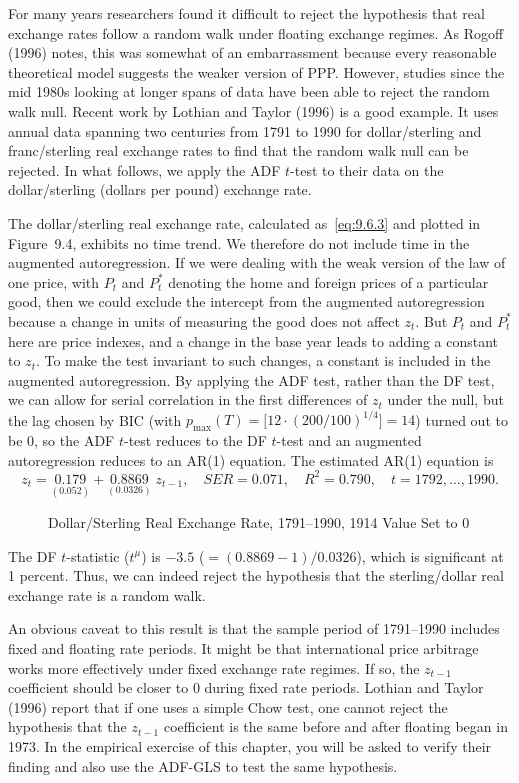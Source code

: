 For many years researchers found it difficult to reject the hypothesis that real
exchange rates follow a random walk under floating exchange regimes. As Rogoff
(1996) notes, this was somewhat of an embarrassment because every reasonable
theoretical model suggests the weaker version of PPP. However, studies since the
mid 1980s looking at longer spans of data have been able to reject the random walk
null. Recent work by Lothian and Taylor (1996) is a good example. It uses annual
data spanning two centuries from 1791 to 1990 for dollar/sterling and franc/sterling
real exchange rates to find that the random walk null can be rejected. In what follows, we apply the ADF $t$-test to their data on the dollar/sterling (dollars per pound)
exchange rate.

The dollar/sterling real exchange rate, calculated as~\eqref{eq:9.6.3} and plotted in Figure~9.4, exhibits no time trend. We therefore do not include time in the augmented
autoregression. If we were dealing with the weak version of the law of one price,
with $P_t$ and $P_t^*$ denoting the home and foreign prices of a particular good, then we
could exclude the intercept from the augmented autoregression because a change
in units of measuring the good does not affect $z_t$. But $P_t$ and $P_t^*$ here are price
indexes, and a change in the base year leads to adding a constant to $z_t$. To make
the test invariant to such changes, a constant is included in the augmented autoregression. By applying the ADF test, rather than the DF test, we can allow for serial
correlation in the first differences of $z_t$ under the null, but the lag chosen by
BIC (with $p_{\max}(T) = \big[12 \cdot (200/100)^{1/4}\big] = 14$) turned out to be 0, so the ADF $t$-test reduces to the DF $t$-test and an augmented autoregression reduces to an AR(1)
equation. The estimated AR(1) equation is
\[
z_t = \underset{(0.052)}{0.179} + \underset{(0.0326)}{0.8869}\; z_{t-1},
\quad SER = 0.071, \quad R^2 = 0.790, \quad t = 1792, \ldots, 1990.
\]

\begin{figure}[htbp]
\centering
{}
\caption{Dollar/Sterling Real Exchange Rate, 1791--1990, 1914 Value Set to 0}
\label{fig:9.4}
\end{figure}

The DF $t$-statistic ($t^\mu$) is $-3.5$ ($= (0.8869 - 1)/0.0326$), which is significant at
1 percent. Thus, we can indeed reject the hypothesis that the sterling/dollar real
exchange rate is a random walk.

An obvious caveat to this result is that the sample period of 1791--1990 includes
fixed and floating rate periods. It might be that international price arbitrage works
more effectively under fixed exchange rate regimes. If so, the $z_{t-1}$ coefficient
should be closer to 0 during fixed rate periods. Lothian and Taylor (1996) report
that if one uses a simple Chow test, one cannot reject the hypothesis that the $z_{t-1}$
coefficient is the same before and after floating began in 1973. In the empirical
exercise of this chapter, you will be asked to verify their finding and also use the
ADF-GLS to test the same hypothesis.

